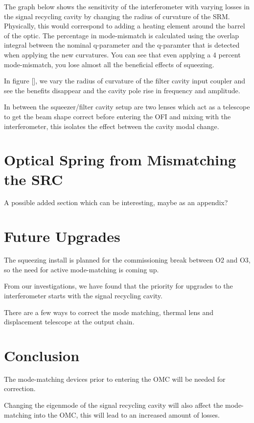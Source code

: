\documentclass[12pt]{iopart}
\begin{document}
The graph below shows the sensitivity of the interferometer with varying losses in the signal recycling cavity by changing the radius of curvature of the SRM.  Physically, this would correspond to adding a heating element around the barrel of the optic.  The percentage in mode-mismatch is calculated using the overlap integral between the nominal q-parameter and the q-paramter that is detected when applying the new curvatures.  You can see that even applying a 4 percent mode-mismatch, you lose almost all the beneficial effects of squeezing.

In figure [], we vary the radius of curvature of the filter cavity input coupler and see the benefits disappear and the cavity pole rise in frequency and amplitude.

In between the squeezer/filter cavity setup are two lenses which act as a telescope to get the beam shape correct before entering the OFI and mixing with the interferometer, this isolates the effect between the cavity modal change.

\section{Optical Spring from Mismatching the SRC}
A possible added section which can be interesting, maybe as an appendix?

\section{Future Upgrades}

The squeezing install is planned for the commissioning break between O2 and O3, so the need for active mode-matching is coming up.

From our investigations, we have found that the priority for upgrades to the interferometer starts with the signal recycling cavity.

There are a few ways to correct the mode matching, thermal lens and displacement telescope at the output chain.


\section{Conclusion}

The mode-matching devices prior to entering the OMC will be needed for correction.

Changing the eigenmode of the signal recycling cavity will also affect the mode-matching into the OMC, this will lead to an increased amount of losses. 
\end{document}
